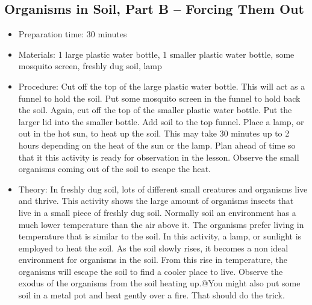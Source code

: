 \subsection{Organisms in Soil, Part B – Forcing Them Out}
\begin{itemize}
\item{Preparation time: 30 minutes}
\item{Materials: 1 large plastic water bottle, 1 smaller plastic water bottle, some mosquito screen, freshly dug soil, lamp}
\item{Procedure: Cut off the top of the large plastic water bottle. This will act as a funnel to hold the soil. Put some mosquito screen in the funnel to hold back the soil. Again, cut off the top of the smaller plastic water bottle. Put the larger lid into the smaller bottle. Add soil to the top funnel. Place a lamp, or out in the hot sun, to heat up the soil. This may take 30 minutes up to 2 hours depending on the heat of the sun or the lamp. Plan ahead of time so that it this activity is ready for observation in the lesson. Observe the small organisms coming out of the soil to escape the heat.}
\item{Theory: In freshly dug soil, lots of different small creatures and organisms live and thrive. This activity shows the large amount of organisms insects that live in a small piece of freshly dug soil. Normally soil an environment has a much lower temperature than the air above it. The organisms prefer living in temperature that is similar to the soil. In this activity, a lamp, or sunlight is employed to heat the soil. As the soil slowly rises, it becomes a non ideal environment for organisms in the soil. From this rise in temperature, the organisms will escape the soil to find a cooler place to live. Observe the exodus of the organisms from the soil heating up.@You might also put some soil in a metal pot and heat gently over a fire. That should do the trick.}
\end{itemize}

